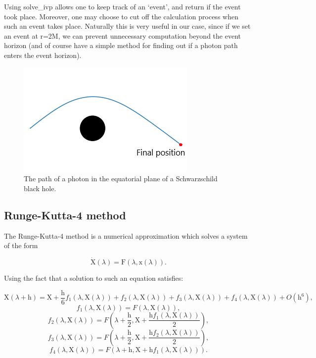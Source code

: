 \documentclass[oneside,openright,frontopenright, singlespacing]{dmathesis}
\begin{document}
\vspace{1em}
	Using solve\_ivp allows one to keep track of an ‘event’, and return if the event took place. Moreover, one may choose to cut off the calculation process when such an event takes place. Naturally this is very useful in our case, since if we set an event at r=2M, we can prevent unnecessary computation beyond the event horizon (and of course have a simple method for finding out if a photon path enters the event horizon).

\begin{figure}[!ht]
	\centering
	\includegraphics[width=0.4\linewidth]{img/Schwarzschildpath}
	\caption{The path of a photon in the equatorial plane of a Schwarzschild black hole.}
	\label{fig:Figure3.1}
\end{figure}

\subsection{Runge-Kutta-4 method}\label{subsec:Subsection3.4.1}

	The Runge-Kutta-4 method is a numerical approximation which solves a system of the form

\vspace{1em}
\[\dot{\mbox{X}}(\lambda) = \mbox{F}(\lambda,\mbox{x}(\lambda)).\]

\vspace{1em}
	Using the fact that a solution to such an equation satisfies:

\vspace{1em}
	\[\mbox{X}(\lambda+\mbox{h}) = \mbox{X} + \frac{\mbox{h}}{6}f_1(\lambda,\mbox{X}(\lambda))+f_2(\lambda,\mbox{X}(\lambda))+f_3(\lambda,\mbox{X}(\lambda))+f_4(\lambda,\mbox{X}(\lambda))+O(\mbox{h}^6),\]
	\[f_1(\lambda,\mbox{X}(\lambda)) = F(\lambda,\mbox{X}(\lambda)),\]
	\[f_2(\lambda,\mbox{X}(\lambda)) = F\left(\lambda+\frac{\mbox{h}}{2},\mbox{X}+\frac{\mbox{h}f_1(\lambda,\mbox{X}(\lambda))}{2}\right),\]
	\[f_3(\lambda,\mbox{X}(\lambda)) = F\left(\lambda+\frac{\mbox{h}}{2},\mbox{X}+\frac{\mbox{h}f_2(\lambda,\mbox{X}(\lambda))}{2}\right),\]
	\[f_4(\lambda,\mbox{X}(\lambda)) = F\left(\lambda+\mbox{h},\mbox{X}+\mbox{h}f_1(\lambda,\mbox{X}(\lambda))\right).\]
\end{document}
